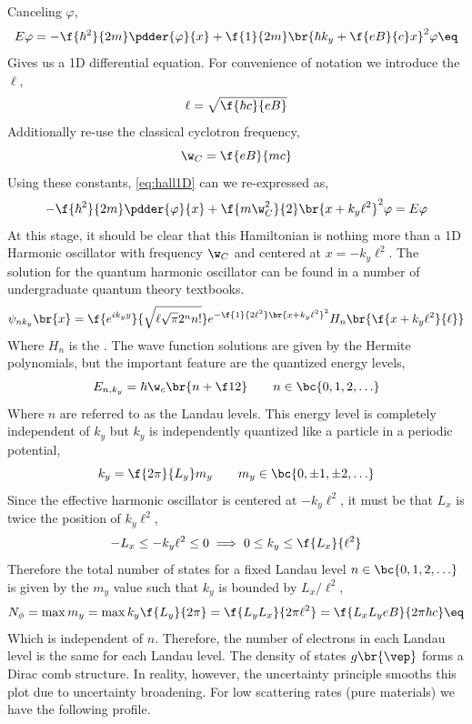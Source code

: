\documentclass{article}
\newcommand{\vp}{\varphi}
\begin{document}
Canceling $\vp$,
\[ E \vp = - \f{\hbar^2}{2m} \pdder{\vp}{x} + \f{1}{2m}\br{\hbar k_y + \f{eB}{c}x}^2 \vp \eq \label{eq:hall1D}\]
Gives us a 1D differential equation. For convenience of notation we introduce the  $\ell$,
\[ \ell = \sqrt{\f{\hbar c}{eB}} \]
Additionally re-use the classical cyclotron frequency,
\[ \w_{C} = \f{eB}{mc} \]
Using these constants, \cref{eq:hall1D} can we re-expressed as,
\[ -\f{\hbar^2}{2m} \pdder{\vp}{x} + \f{m\w_{C}^2}{2} \br{x + k_y \ell^{2}}^2 \vp = E \vp \]
At this stage, it should be clear that this Hamiltonian is nothing more than a 1D Harmonic oscillator with frequency $\w_{C}$ and centered at $x = - k_y \ell^{2}$. The solution for the quantum harmonic oscillator can be found in a number of undergraduate quantum theory textbooks.
\[ \psi_{n k_y}\br{x} = \f{e^{ik_y y}}{\sqrt{\ell \sqrt{\pi} 2^{n} n!}} e^{-\f{1}{2 \ell^2} \br{x + k_y \ell^2}^2} H_n\br{\f{x + k_y \ell^2}{\ell}} \]
Where $H_n$ is the . The wave function solutions are given by the Hermite polynomials, but the important feature are the quantized energy levels,
\[ E_{n,k_y} = \hbar \w_c \br{n + \f12} \qquad n \in \bc{0, 1, 2, \ldots} \]
Where $n$ are referred to as the Landau levels. This energy level is completely independent of $k_y$ but $k_y$ is independently quantized like a particle in a periodic potential,
\[ k_y = \f{2\pi}{L_y} m_y \qquad m_y \in \bc{0, \pm 1, \pm 2, \ldots}\]
Since the effective harmonic oscillator is centered at $-k_y \ell^2$, it must be that $L_x$ is twice the position of $k_y \ell^2$,
\[ -L_x \leq -k_y \ell^2 \leq 0 \implies 0 \leq k_y \leq \f{L_x}{\ell^2} \]
Therefore the total number of states for a fixed Landau level $n \in \bc{0,1,2,\ldots}$ is given by the $m_y$ value such that $k_y$ is bounded by $L_x / \ell^2$,
\[ N_{\phi} = \max{m_y} = \max{k_y} \f{L_y}{2\pi} = \f{L_yL_x}{2\pi\ell^2} = \f{L_xL_y eB}{2 \pi \hbar c}  \eq \label{eq:landau_occupancy}\]
Which is independent of $n$. Therefore, the number of electrons in each Landau level is the same for each Landau level. The density of states $g\br{\vep}$ forms a Dirac comb structure. In reality, however, the uncertainty principle smooths this plot due to uncertainty broadening. For low scattering rates (pure materials) we have the following profile.
\begin{center}
\end{center}
\end{document}

